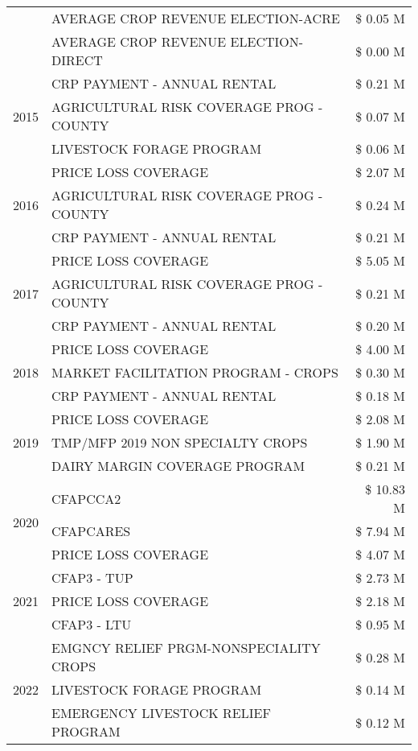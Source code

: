 \begin{tabular}{llr}
 & AVERAGE CROP REVENUE ELECTION-ACRE & \$ 0.05 M \\
 & AVERAGE CROP REVENUE ELECTION-DIRECT & \$ 0.00 M \\
\cline{1-3}
\multirow[t]{3}{*}{2015} & CRP PAYMENT - ANNUAL RENTAL & \$ 0.21 M \\
 & AGRICULTURAL RISK COVERAGE PROG - COUNTY & \$ 0.07 M \\
 & LIVESTOCK FORAGE PROGRAM & \$ 0.06 M \\
\cline{1-3}
\multirow[t]{3}{*}{2016} & PRICE LOSS COVERAGE & \$ 2.07 M \\
 & AGRICULTURAL RISK COVERAGE PROG - COUNTY & \$ 0.24 M \\
 & CRP PAYMENT - ANNUAL RENTAL & \$ 0.21 M \\
\cline{1-3}
\multirow[t]{3}{*}{2017} & PRICE LOSS COVERAGE & \$ 5.05 M \\
 & AGRICULTURAL RISK COVERAGE PROG - COUNTY & \$ 0.21 M \\
 & CRP PAYMENT - ANNUAL RENTAL & \$ 0.20 M \\
\cline{1-3}
\multirow[t]{3}{*}{2018} & PRICE LOSS COVERAGE & \$ 4.00 M \\
 & MARKET FACILITATION PROGRAM - CROPS & \$ 0.30 M \\
 & CRP PAYMENT - ANNUAL RENTAL & \$ 0.18 M \\
\cline{1-3}
\multirow[t]{3}{*}{2019} & PRICE LOSS COVERAGE & \$ 2.08 M \\
 & TMP/MFP 2019 NON SPECIALTY CROPS & \$ 1.90 M \\
 & DAIRY MARGIN COVERAGE PROGRAM & \$ 0.21 M \\
\cline{1-3}
\multirow[t]{3}{*}{2020} & CFAPCCA2 & \$ 10.83 M \\
 & CFAPCARES & \$ 7.94 M \\
 & PRICE LOSS COVERAGE & \$ 4.07 M \\
\cline{1-3}
\multirow[t]{3}{*}{2021} & CFAP3 - TUP & \$ 2.73 M \\
 & PRICE LOSS COVERAGE & \$ 2.18 M \\
 & CFAP3 - LTU & \$ 0.95 M \\
\cline{1-3}
\multirow[t]{3}{*}{2022} & EMGNCY RELIEF PRGM-NONSPECIALITY CROPS & \$ 0.28 M \\
 & LIVESTOCK FORAGE PROGRAM & \$ 0.14 M \\
 & EMERGENCY LIVESTOCK RELIEF PROGRAM & \$ 0.12 M \\
\cline{1-3}
\bottomrule
\end{tabular}
